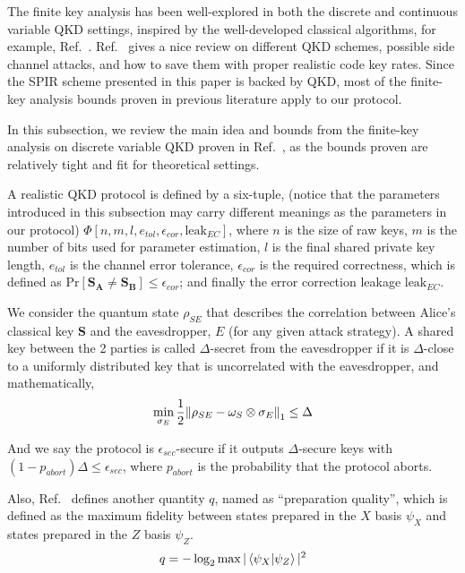 \documentclass[%
 reprint,
superscriptaddress,
 amsmath,amssymb,
 aps,
]{revtex4-2}
\begin{document}
The finite key analysis has been well-explored in both the discrete and continuous variable QKD settings, inspired by the well-developed classical algorithms, for example, Ref.~\cite{Finite_key_analysis1, Finite_key_analysis2, Finite_key_analysis3, Rates_for_realistic_code1, Rates_for_realistic_code2, Rates_for_realistic_code3}. Ref.~\cite{Rates_for_realistic_code2} gives a nice review on different QKD schemes, possible side channel attacks, and how to save them with proper realistic code key rates. Since the SPIR scheme presented in this paper is backed by QKD, most of the finite-key analysis bounds proven in previous literature apply to our protocol. 

In this subsection, we review the main idea and bounds from the finite-key analysis on discrete variable QKD proven in Ref.~\cite{Finite_key_analysis1}, as the bounds proven are relatively tight and fit for theoretical settings.

A realistic QKD protocol is defined by a six-tuple, (notice that the parameters introduced in this subsection may carry different meanings as the parameters in our protocol) $\Phi[n, m, l, e_{tol}, \epsilon_{cor}, \text{leak}_{EC}]$, where $n$ is the size of raw keys, $m$ is the number of bits used for parameter estimation, $l$ is the final shared private key length, $e_{tol}$ is the channel error tolerance, $\epsilon_{cor}$ is the required correctness, which is defined as $\text{Pr}[\mathbf{S_{A}}\ne \mathbf{S_{B}}]\le\epsilon_{cor}$; and finally the error correction leakage $\text{leak}_{EC}$.

We consider the quantum state $\rho_{SE}$ that describes the correlation between Alice’s classical key $\mathbf{S}$ and the eavesdropper, $E$ (for any given attack strategy). A shared key between the 2 parties is called $\Delta$-secret from the eavesdropper if it is $\Delta$-close to a uniformly distributed key that is uncorrelated with the eavesdropper, and mathematically,
\begin{equation}
    \min_{\sigma_E}\frac{1}{2}\norm{\rho_{SE}-\omega_S\otimes\sigma_E}_1\le\Delta
\end{equation}

And we say the protocol is $\epsilon_{sec}$-secure if it outputs $\Delta$-secure keys with $(1-p_{abort})\Delta\le \epsilon_{sec}$, where $p_{abort}$ is the probability that the protocol aborts.

Also, Ref.~\cite{Finite_key_analysis1} defines another quantity $q$, named as ``preparation quality'', which is defined as the maximum fidelity between states prepared in the $X$ basis $\psi_X$ and states prepared in the $Z$ basis $\psi_Z$.
\begin{equation}
    q=-\log_2\max|\bra{\psi_X}\ket{\psi_Z}|^2
\end{equation}
\end{document}
